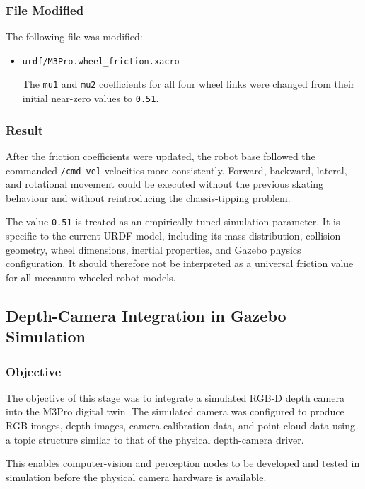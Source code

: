 \documentclass{article}
\begin{document}
\subsubsection{File Modified}

The following file was modified:

\begin{itemize}
    \item \texttt{urdf/M3Pro.wheel\_friction.xacro}

    The \texttt{mu1} and \texttt{mu2} coefficients for all four wheel links were changed from their initial near-zero values to \texttt{0.51}.
\end{itemize}

\subsubsection{Result}

After the friction coefficients were updated, the robot base followed the commanded \texttt{/cmd\_vel} velocities more consistently. Forward, backward, lateral, and rotational movement could be executed without the previous skating behaviour and without reintroducing the chassis-tipping problem.

The value \texttt{0.51} is treated as an empirically tuned simulation parameter. It is specific to the current URDF model, including its mass distribution, collision geometry, wheel dimensions, inertial properties, and Gazebo physics configuration. It should therefore not be interpreted as a universal friction value for all mecanum-wheeled robot models.


\subsection{Depth-Camera Integration in Gazebo Simulation}
\label{sec:depth_camera_integration}

\subsubsection{Objective}

The objective of this stage was to integrate a simulated RGB-D depth camera into the M3Pro digital twin. The simulated camera was configured to produce RGB images, depth images, camera calibration data, and point-cloud data using a topic structure similar to that of the physical depth-camera driver.

This enables computer-vision and perception nodes to be developed and tested in simulation before the physical camera hardware is available.
\end{document}
